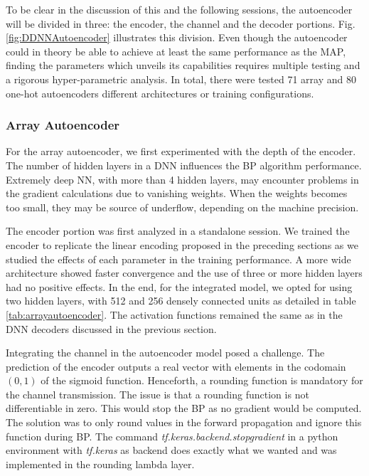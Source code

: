 \documentclass[conference]{IEEEtran}
\begin{document}
To be clear in the discussion of this and the following sessions, the autoencoder will be divided in three: the encoder, the channel and the decoder portions. Fig. \ref{fig:DDNNAutoencoder} illustrates this division. Even though the autoencoder could in theory be able to achieve at least the same performance as the MAP, finding the parameters which unveils its capabilities requires multiple testing and a rigorous hyper-parametric analysis. In total, there were tested 71 array and 80 one-hot autoencoders different architectures or training configurations.

\subsubsection{Array Autoencoder}

For the array autoencoder, we first experimented with the depth of the encoder. The number of hidden layers in a DNN influences the BP algorithm performance. Extremely deep NN, with more than 4 hidden layers, may encounter problems in the gradient calculations due to vanishing weights. When the weights becomes too small, they may be source of underflow, depending on the machine precision. 

The encoder portion was first analyzed in a standalone session. We trained the encoder to replicate the linear encoding proposed in the preceding sections as we studied the effects of each parameter in the training performance. A more wide architecture showed faster convergence and the use of three or more hidden layers had no positive effects. In the end, for the integrated model, we opted for using two hidden layers, with 512 and 256 densely connected units as detailed in table \ref{tab:arrayautoencoder}. The activation functions remained the same as in the DNN decoders discussed in the previous section.

Integrating the channel in the autoencoder model posed a challenge.  The prediction of the encoder outputs a real vector with elements in the codomain $(0,1)$ of the sigmoid function. Henceforth, a rounding function is mandatory for the channel transmission. The issue is that a rounding function is not differentiable in zero. This would stop the BP as no gradient would be computed. The solution was to only round values in the forward propagation and ignore this function during BP. The command \textit{tf.keras.backend.stop\textunderscore gradient} in a python environment with \textit{tf.keras} as backend does exactly what we wanted and was implemented in the rounding lambda layer. 
\end{document}
